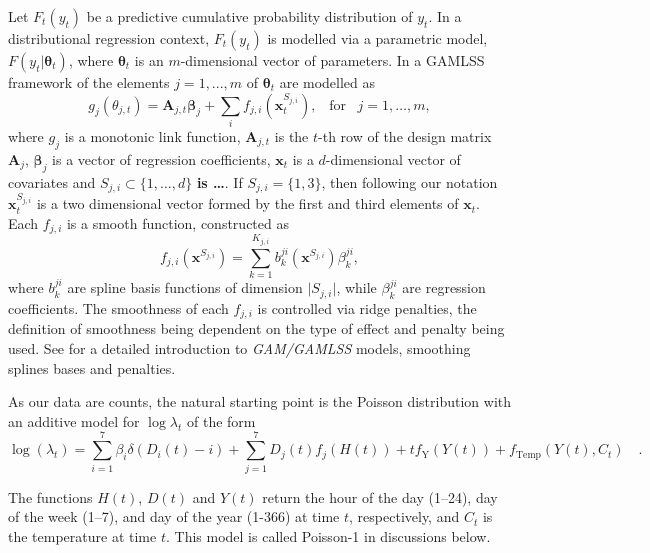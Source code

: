 \documentclass[]{elsarticle} %
\begin{document}
Let \(F_t(y_t)\) be a predictive cumulative probability distribution of \(y_t\). In a distributional regression context, \(F_t(y_t)\) is modelled via a parametric model, \(F(y_t|\bm \theta_t)\), where \(\bm \theta_t\) is an \(m\)-dimensional vector of parameters. In a GAMLSS framework of \citet{Rigby2005} the elements \(j=1,...,m\) of \(\bm \theta_t\) are modelled as
\begin{equation}
    g_j(\theta_{j,t})=\mathbf{A}_{j,t} \bm{\beta}_j + \sum_{i} f_{j,i}({\bm x}^{S_{j,i}}_t), \;\;\; \text{for} \;\;\; j = 1, \dots, m,
    \label{eq:basicGAM}
\end{equation}
where \(g_j\) is a monotonic link function, \(\mathbf{A}_{j,t}\) is the \(t\)-th row of the design matrix \(\mathbf{A}_j\), \(\bm \beta_j\) is a vector of regression coefficients, \(\bm x_t\) is a \(d\)-dimensional vector of covariates and \(S_{j,i} \subset \{1, \dots, d\}\) \textbf{is \ldots{}}. If \(S_{j,i} = \{1, 3\}\), then following our notation \({\bm x}_{t}^{S_{j,i}}\) is a two dimensional vector formed by the first and third elements of \(\bm x_t\). Each \(f_{j,i}\) is a smooth function, constructed as
\begin{equation}
    f_{j,i}(\bm x^{S_{j,i}}) = \sum_{k=1}^{K_{j,i}} b^{ji}_k (\bm x^{S_{j,i}}) \beta_k^{ji},
    \label{eq:smmothfunction}
\end{equation}
where \(b^{ji}_k\) are spline basis functions of dimension \(\vert S_{j,i} \vert\), while \(\beta_k^{ji}\) are regression coefficients. The smoothness of each \(f_{j,i}\) is controlled via ridge penalties, the definition of smoothness being dependent on the type of effect and penalty being used. See \citet{Wood2017} for a detailed introduction to \emph{GAM/GAMLSS} models, smoothing splines bases and penalties.

As our data are counts, the natural starting point is the Poisson distribution with an additive model for \(\log \lambda_t\) of the form
\begin{equation}
  \log(\lambda_t) = \sum_{i=1}^7 \beta_i \delta(D_i(t)-i) + \sum_{j=1}^7 D_j(t) f_j(H(t)) + t f_\text{Y}(Y(t)) + f_\text{Temp}(Y(t),C_t) \quad .
 \label{eq:additivemodel}
\end{equation}

The functions \(H(t)\), \(D(t)\) and \(Y(t)\) return the hour of the day (1--24), day of the week (1--7), and day of the year (1-366) at time \(t\), respectively, and \(C_t\) is the temperature at time \(t\). This model is called Poisson-1 in discussions below.
\end{document}
